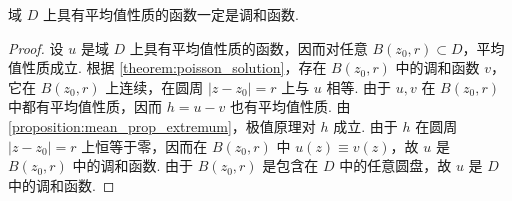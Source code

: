 \documentclass[../../main.tex]{subfiles}%
\begin{document}
\begin{theorem}
域 \(D\) 上具有平均值性质的函数一定是调和函数.
\end{theorem}
\begin{proof}
设 \(u\) 是域 \(D\) 上具有平均值性质的函数，因而对任意 \(B(z_0,r)\subset D\)，平均值性质成立. 根据 \cref{theorem:poisson_solution}，存在 \(B(z_0,r)\) 中的调和函数 \(v\)，它在 \(B(z_0,r)\) 上连续，在圆周 \(|z-z_0|=r\) 上与 \(u\) 相等. 由于 \(u,v\) 在 \(B(z_0,r)\) 中都有平均值性质，因而 \(h=u-v\) 也有平均值性质. 由\cref{proposition:mean_prop_extremum}，极值原理对 \(h\) 成立. 由于 \(h\) 在圆周 \(|z-z_0|=r\) 上恒等于零，因而在 \(B(z_0,r)\) 中 \(u(z)\equiv v(z)\)，故 \(u\) 是 \(B(z_0,r)\) 中的调和函数. 由于 \(B(z_0,r)\) 是包含在 \(D\) 中的任意圆盘，故 \(u\) 是 \(D\) 中的调和函数.
\end{proof}
\end{document}
